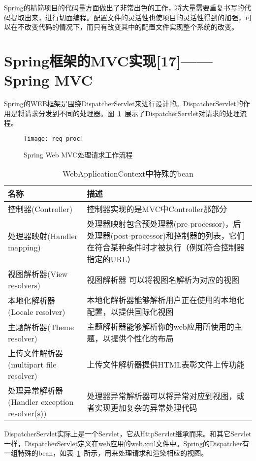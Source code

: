 Spring的精简项目的代码量方面做出了非常出色的工作，将大量需要重复书写的代码提取出来，进行切面编程。配置文件的灵活性也使项目的灵活性得到的加强，可以在不改变代码的情况下，而只有改变其中的配置文件实现整个系统的改变。

\section{Spring框架的MVC实现[17]——Spring MVC}
Spring的WEB框架是围绕DispatcherServlet来进行设计的。DispatcherServlet的作用是将请求分发到不同的处理器。图~\ref{fig:req_proc}~展示了DispatcherServlet对请求的处理流程。
\begin{figure}[htbp]
\centering
\texttt{[image: req\_proc]}
\caption{Spring Web MVC处理请求工作流程}\label{fig:req_proc}
\vspace{\baselineskip}
\end{figure}
\begin{table}[htbp]
\caption{WebApplicationContext中特殊的bean}\label{tab:bean}
\vspace{0.5em}\centering\wuhao
\begin{tabular}{|m{6cm}|m{6cm}|}
\toprule[1.5pt]
名称 & 描述\\
\midrule[1pt]
控制器(Controller) & 控制器实现的是MVC中Controller那部分\\ \hline
处理器映射(Handler mapping) & 处理器映射包含预处理器(pre-processor)，后处理器(post-processor)和控制器的列表，它们在符合某种条件时才被执行（例如符合控制器指定的URL）\\ \hline
视图解析器(View resolvers) & 视图解析器 可以将视图名解析为对应的视图\\ \hline
本地化解析器(Locale resolver) & 本地化解析器能够解析用户正在使用的本地化配置，以提供国际化视图\\ \hline
主题解析器(Theme resolver) & 主题解析器能够解析你的web应用所使用的主题，以提供个性化的布局\\ \hline
上传文件解析器(multipart file resolver) & 上传文件解析器提供HTML表彰文件上传功能\\ \hline
处理异常解析器(Handler exception resolver(s)) & 处理器异常解析器可以将异常对应到视图，或者实现更加复杂的异常处理代码\\
\bottomrule[1.5pt]
\end{tabular}
\vspace{\baselineskip}
\end{table}
DispatcherServlet实际上是一个Servlet，它从HttpServlet继承而来。和其它Servlet一样，DispatcherServlet定义在web应用的web.xml文件中。Spring的Dispatcher有一组特殊的bean，如表~\ref{tab:bean}~所示，用来处理请求和渲染相应的视图。

